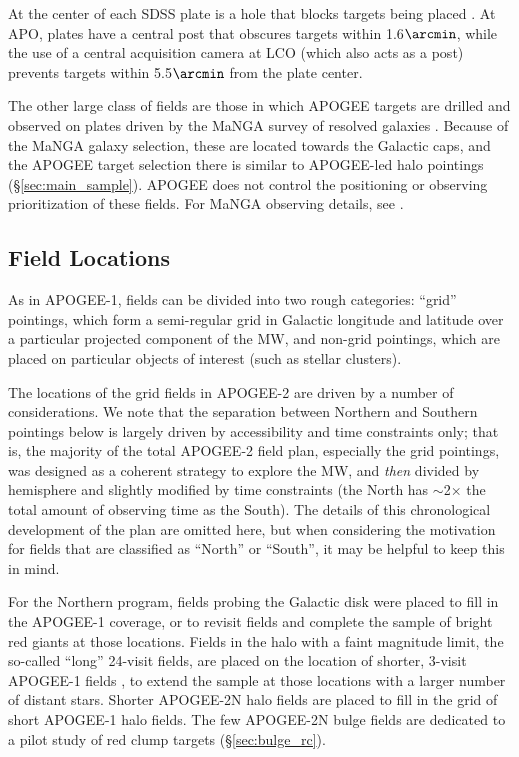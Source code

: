 \documentclass[12pt,twocolumn]{emulateapj}
\begin{document}
At the center of each SDSS plate is a hole that blocks targets being placed \citep[e.g.,][]{Owen_1994_sdssfibers}.  At APO, plates have a central post that obscures targets within 1.6$\arcmin$, while the use of a central acquisition camera at LCO (which also acts as a post) prevents targets within 5.5$\arcmin$ from the plate center.

The other large class of fields are those in which APOGEE targets are drilled and observed on plates driven by the MaNGA survey of resolved galaxies \citep{Bundy_2015_manga}.  Because of the MaNGA galaxy selection, these are located towards the Galactic caps, and the APOGEE target selection there is similar to APOGEE-led halo pointings (\S\ref{sec:main_sample}).  APOGEE does not control the positioning or observing prioritization of these fields.  For MaNGA observing details, see \citet{Law_2015_mangastrategy}.


\subsection{Field Locations}
\label{sec:field_locations}

As in APOGEE-1, fields can be divided into two rough categories: ``grid'' pointings, 
which form a semi-regular grid in Galactic longitude and latitude over a particular projected component of the MW,
and non-grid pointings, which are placed on particular objects of interest (such as stellar clusters).

The locations of the grid fields in APOGEE-2 are driven by a number of considerations.
We note that the separation between Northern and Southern pointings 
below is largely driven by accessibility and time constraints only; that is,
the majority of the total APOGEE-2 field plan, especially the grid pointings,
was designed as a coherent strategy to explore the MW, and {\it then} divided by hemisphere
and slightly modified by time constraints (the North has $\sim$2$\times$ the total amount of observing time as the South).  
The details of this chronological development of the plan are omitted here,
but when considering the motivation for fields that are classified as ``North'' or ``South'',
it may be helpful to keep this in mind.

For the Northern program, fields probing the Galactic disk were placed to fill in the APOGEE-1 coverage, or to revisit fields and complete the sample of bright red giants at those locations.
Fields in the halo with a faint magnitude limit, the so-called ``long'' 24-visit fields, are placed
on the location of shorter, 3-visit APOGEE-1 fields \citep{Zasowski_2013_apogeetargeting}, to extend the sample at those
locations with a larger number of distant stars.  
Shorter APOGEE-2N halo fields are placed to fill in the grid of short APOGEE-1 halo fields.
The few APOGEE-2N bulge fields are dedicated to a pilot study of red clump targets (\S\ref{sec:bulge_rc}).
\end{document}
